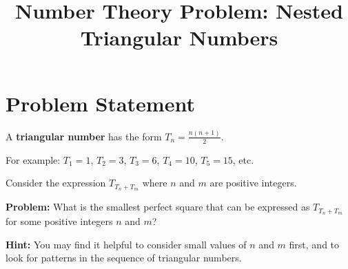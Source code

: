 \documentclass[12pt]{article}
\title{Number Theory Problem: Nested Triangular Numbers}
\author{}
\date{}
\begin{document}
\maketitle

\section*{Problem Statement}

A \textbf{triangular number} has the form $T_n = \frac{n(n+1)}{2}$.

For example: $T_1 = 1$, $T_2 = 3$, $T_3 = 6$, $T_4 = 10$, $T_5 = 15$, etc.

Consider the expression $T_{T_n + T_m}$ where $n$ and $m$ are positive integers.

\textbf{Problem:} What is the smallest perfect square that can be expressed as $T_{T_n + T_m}$ for some positive integers $n$ and $m$?

\vspace{0.5cm}

\textbf{Hint:} You may find it helpful to consider small values of $n$ and $m$ first, and to look for patterns in the sequence of triangular numbers.
\end{document}
